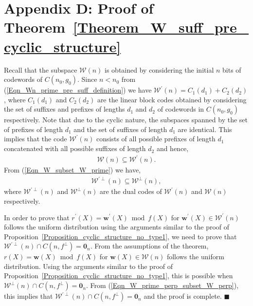 \documentclass[10pt,journal]{IEEEtran}
\begin{document}
\section*{Appendix D: Proof of Theorem~\ref{Theorem_W_suff_pre_cyclic_structure}}
%  
Recall that the subspace $\mathcal{W}(n)$ is obtained by considering the initial $n$ bits of codewords
of $C(n_0,g_0)$. Since $ n< n_0$ from (\ref{Eqn_Wn_prime_pre_suff_definition}) we have 
$\mathcal{W}^{\prime}(n) = C_1(d_1) + C_2(d_2)$, where 
$C_1(d_1)$ and $C_2(d_2)$ are the linear block codes obtained by 
considering the set of suffixes and prefixes of lengths $d_1$ and $d_2$ of codewords in $C(n_0,g_0)$ respectively.
% 
Note that due to the cyclic nature, the subspaces spanned by the set of prefixes of length $d_1$
and the set of suffixes of length $d_1$ are identical.
% 
This implies that the code $\mathcal{W}^{\prime}(n)$ consists of all possible prefixes of length $d_1$ concatenated with
all possible suffixes of length $d_2$ and hence,
% 
\begin{align}
%  
\mathcal{W}(n) \subseteq \mathcal{W}^{\prime}(n).
\label{Eqn_W_subset_W_prime}
% 
\end{align}
% 
From (\ref{Eqn_W_subset_W_prime}) we have,
% 
\begin{align}
%  
\mathcal{W}^{\prime \perp}(n) \subseteq \mathcal{W}^{\perp}(n),
\label{Eqn_W_prime_perp_subset_W_perp}
% 
\end{align}
% 
where $\mathcal{W}^{\prime \perp}(n)$ and $\mathcal{W}^{\perp}(n)$ are the dual codes of 
$\mathcal{W}^{\prime}(n)$ and $\mathcal{W}(n)$ respectively.

In order to prove that $r^{\prime}(X) = \mathbf{w}^{\prime}(X) \bmod f(X)$ for $\mathbf{w}^{\prime}(X) \in \mathcal{W}^{\prime}(n)$
follows the uniform distribution using the arguments similar to the proof of Proposition~\ref{Proposition_cyclic_structure_no_type1},
we need to prove that $\mathcal{W}^{\prime \perp}(n) \cap C(n,f^{\perp}) = \mathbf{0}_n$.
% 
From the assumptions of the theorem, $r(X) = \mathbf{w}(X) \bmod f(X)$ for $\mathbf{w}(X) \in \mathcal{W}(n)$
follows the uniform distribution. 
% 
Using the arguments similar to the proof of Proposition~\ref{Proposition_cyclic_structure_no_type1},
this is possible when $\mathcal{W}^{\perp}(n) \cap C(n,f^{\perp}) = \mathbf{0}_n$.
% 
From (\ref{Eqn_W_prime_perp_subset_W_perp}), this implies that $\mathcal{W}^{\prime \perp}(n) \cap C(n,f^{\perp}) = \mathbf{0}_n$
and the proof is complete.
% 
\hfill $\blacksquare$
\end{document}
